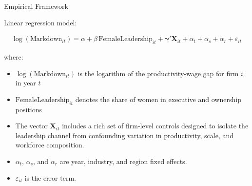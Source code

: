 \documentclass[11pt,aspectratio=169]{beamer}
\begin{document}
\begin{frame}{Empirical Framework}

Linear regression model:

\begin{align}
  \log(\text{Markdown}_{it}) = \alpha + \beta \, \text{FemaleLeadership}_{it} + \boldsymbol{\gamma}' \mathbf{X}_{it} + \alpha_t + \alpha_s + \alpha_r + \varepsilon_{it}
\end{align}

where:
\begin{itemize}
  \item $\log(\text{Markdown}_{it})$ is the logarithm of the productivity-wage gap for firm $i$ in year $t$
  \item $\text{FemaleLeadership}_{it}$ denotes the share of women in executive and ownership positions
  \item The vector $\mathbf{X}_{it}$ includes a rich set of firm-level controls designed to isolate the leadership channel from confounding variation in productivity, scale, and workforce composition.
  \item $\alpha_t$, $\alpha_s$, and $\alpha_r$ are year, industry, and region fixed effects.
  \item $\varepsilon_{it}$ is the error term.
\end{itemize}

\end{frame}
\end{document}

